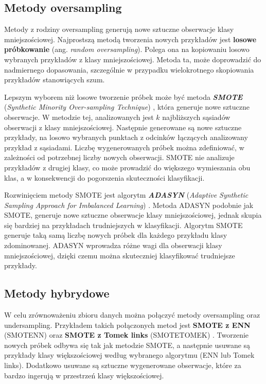 \subsection{Metody oversampling}
Metody z rodziny oversampling generują nowe sztuczne obserwacje klasy mniejszościowej. Najprostszą metodą tworzenia nowych przykładów jest \textbf{losowe próbkowanie} (ang. \textit{random oversampling}). Polega ona na kopiowaniu losowo wybranych przykładów z klasy mniejszościowej. Metoda ta, może doprowadzić do nadmiernego dopasowania, szczególnie w przypadku wielokrotnego skopiowania przykładów stanowiących szum. \par
Lepszym wyborem niż losowe tworzenie próbek może być metoda \textbf{\textit{SMOTE}} (\textit{Synthetic Minority Over-sampling Technique}) \cite{smotec}, która generuje nowe sztuczne obserwacje. W metodzie tej, analizowanych jest $k$ najbliższych sąsiadów obserwacji z klasy mniejszościowej. Następnie generowane są nowe sztuczne przykłady, na losowo wybranych punktach z odcinków łączących analizowany przykład z sąsiadami. Liczbę wygenerowanych próbek można zdefiniować, w zależności od potrzebnej liczby nowych obserwacji. SMOTE nie analizuje przykładów z drugiej klasy, co może prowadzić do większego wymieszania obu klas, a w konsekwencji do pogorszenia skuteczności klasyfikacji. \par
Rozwinięciem metody SMOTE jest algorytm \textbf{\textit{ADASYN}} (\textit{Adaptive Synthetic Sampling Approach for Imbalanced Learning}) \cite{adasync}. Metoda ADASYN podobnie jak SMOTE, generuje nowe sztuczne obserwacje klasy mniejszościowej, jednak skupia się bardziej na przykładach trudniejszych w klasyfikacji. Algorytm SMOTE generuje taką samą liczbę nowych próbek dla każdego przykładu klasy zdominowanej. ADASYN wprowadza różne wagi dla obserwacji klasy mniejszościowej, dzięki czemu można skuteczniej klasyfikować trudniejsze przykłady.
\subsection{Metody hybrydowe}
W celu zrównoważeniu zbioru danych można połączyć metody oversampling oraz undersampling. Przykładem takich połączonych metod jest \textbf{SMOTE z ENN} (SMOTENN) oraz \textbf{SMOTE z Tomek links} (SMOTETOMEK) \cite{hybrid}. Tworzenie nowych próbek odbywa się tak jak metodzie SMOTE, a następnie usuwane są przykłady klasy większościowej według wybranego algorytmu (ENN lub Tomek links). Dodatkowo usuwane są sztuczne wygenerowane obserwacje, które za bardzo ingerują w przestrzeń klasy większościowej.
